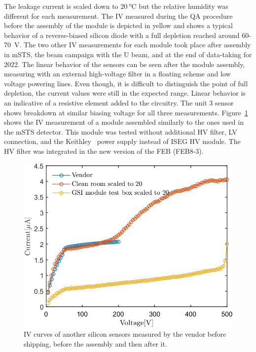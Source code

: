 The leakage current is scaled down to $\SI{20}{\celsius}$ but the relative humidity was different for each measurement. The IV measured during the QA procedure before the assembly of the module is depicted in yellow and shows a typical behavior of a reverse-biased silicon diode with a full depletion reached around 60-70~V. The two other IV measurements for each module took place after assembly in \gls{mSTS}, the beam campaign with the U beam, and at the end of data-taking for 2022. The linear behavior of the sensors can be seen after the module assembly, measuring with an external high-voltage filter in a floating scheme and low voltage powering lines. Even though, it is difficult to distinguish the point of full depletion, the current values were still in the expected range. Linear behavior is an indicative of a resistive element added to the circuitry. The unit 3 sensor shows breakdown at similar biasing voltage for all three measurements. Figure~\ref{fig_IV_good} shows the IV measurement of a module assembled similarly to the ones used in the \gls{mSTS} detector. This module was tested without additional \gls{HV} filter, \gls{LV} connection, and the Keithley~\cite{Keithley} power supply instead of ISEG \gls{HV} module. The \gls{HV} filter was integrated in the new version of the \gls{FEB} (FEB8-3). 

\begin{figure}[!h]
\centering
\includegraphics[width=0.5\columnwidth]{Chapter6/DCS/images/IV/30304Whole.png}
\caption{IV curves of another silicon sensors measured by the vendor before shipping, before the assembly and then after it.} 
\label{fig_IV_good}
\end{figure}

\newpage
